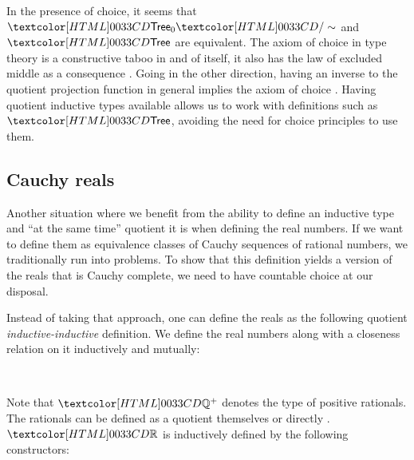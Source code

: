 In the presence of choice, it seems that
$\quotty{\pretreety}{\treerel}$ and $\treety$ are equivalent. The
axiom of choice in type theory is a constructive taboo in and of
itself, it also has the law of excluded middle as a consequence
\cite{Diaconescu1975}. Going in the other direction, having an inverse
to the quotient projection function in general implies the axiom of
choice \cite{Hofmann1995}. Having quotient inductive types available
allows us to work with definitions such as $\treety$, avoiding the
need for choice principles to use them.

\subsection{Cauchy reals}

Another situation where we benefit from the ability to define an
inductive type and ``at the same time'' quotient it is when defining
the real numbers. If we want to define them as equivalence classes of
Cauchy sequences of rational numbers, we traditionally run into
problems. To show that this definition yields a version of the reals
that is Cauchy complete, we need to have countable choice at our
disposal.

Instead of taking that approach, one can define the reals as the
following quotient \emph{inductive-inductive} definition. We define
the real numbers along with a closeness relation on it inductively and
mutually:
\begin{sorts}
  \sortnamety{\realty}{\Set} \\
  \sortnamety{\realrel{\_}{\_}{\_}}{\ratty_+ \to \realty \to \realty \to \Set}
\end{sorts}

Note that $\ratty^+$ denotes the type of positive rationals. The
rationals can be defined as a quotient themselves or directly
\cite{Altenkirch2011ii}. $\realty$ is inductively defined by the
following constructors:

\begin{datatype}{\realty}{}
  \constr{\realrat}{\ratty \to \realty} \\
   \\
   \\
\end{datatype}

